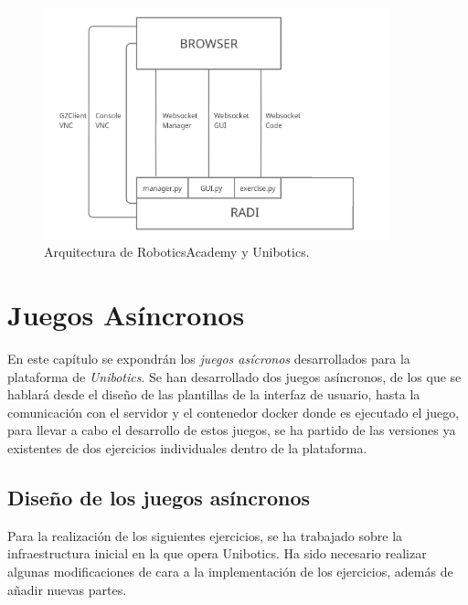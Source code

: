 \documentclass[a4paper, 12pt]{book}
\begin{document}
\begin{figure}[H]
	\centering
    \includegraphics[width=10cm]{img/robotics_academy_architecture.png}
    \caption{Arquitectura de RoboticsAcademy y Unibotics.}
    \label{figura:unibotics_architecture}
\end{figure}



\cleardoublepage
\chapter{Juegos Asíncronos}

En este capítulo se expondrán los \emph{juegos asícronos} desarrollados para la plataforma de \textit{Unibotics}. Se han desarrollado dos juegos asíncronos, de los que se hablará desde el diseño de las plantillas de la interfaz de usuario, hasta la comunicación con el servidor y el contenedor docker donde es ejecutado el juego, para llevar a cabo el desarrollo de estos juegos, se ha partido de las versiones ya existentes de dos ejercicios individuales dentro de la plataforma.

\section{Diseño de los juegos asíncronos}
\label{sec:async_infraestructura}

Para la realización de los siguientes ejercicios, se ha trabajado sobre la infraestructura inicial en la que opera Unibotics. Ha sido necesario realizar algunas modificaciones de cara a la implementación de los ejercicios, además de añadir nuevas partes. 
\end{document}
